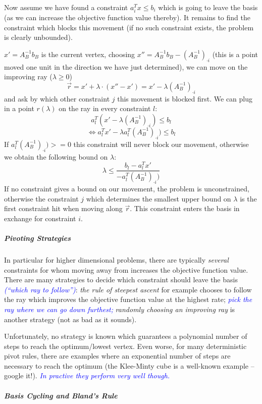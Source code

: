 \documentclass{article}
\begin{document}
Now assume we have found a constraint $a_i^T x \leq b_i$
which is going to leave the basis (as we can increase the objective function value thereby). 
It remains to find the constraint which
blocks this movement (if no such constraint exists, the problem is clearly unbounded).

$x'=A_B^{-1}b_B$ is the current vertex, choosing $x''=A_B^{-1}b_B - (A_B^{-1})_{\cdot i}$ (this is a point moved
one unit in the direction we have just determined), we can move 
on the improving ray  ($\lambda\geq 0$)
\[
	\overrightarrow{r}=x' + \lambda \cdot {(x''-x')}
			= x' - \lambda (A_B^{-1})_{\cdot i}
\]
and ask by which other constraint $j$ this movement is blocked first.
We can plug in a point $r(\lambda)$ on the ray in every constraint $l$:
\[
	a_l^{T}(x'-\lambda (A_B^{-1})_{\cdot i})\leq b_l
\]
\[
\Leftrightarrow	a_l^{T}x'-\lambda a_l^{T}(A_B^{-1})_{\cdot i})\leq b_l
\]
If $a_l^{T}(A_B^{-1})_{\cdot i})>=0$ this constraint will never block our movement, otherwise
we obtain the following bound on $\lambda$:
\[
	\lambda \leq \frac{b_l - a_l^{T}x'}{-a_l^{T}(A_B^{-1})_{\cdot i})}
\]
If no constraint gives a bound on our movement, the problem is unconstrained, otherwise the constraint $j$
which determines the smallest upper bound on $\lambda$ is the first constraint hit when moving along
$\overrightarrow{r}$. This constraint enters the basis in exchange for constraint $i$.

\subparagraph*{Pivoting Strategies}
In particular for higher dimensional problems, there are typically \emph{several} constraints for whom moving away from increases the objective function value. There are many strategies to decide which constraint should leave the basis \textcolor{blue}{\emph{(``which ray to follow'')}}: \emph{the rule of steepest ascent} for example chooses to follow the ray which improves the objective function value at the highest rate; \textcolor{blue}{\emph{pick the ray where we can go down furthest;}} \emph{randomly choosing an improving ray} is another strategy (not as bad as it sounds).

Unfortunately, no strategy is known which guarantees a polynomial number of steps to reach the optimum/lowest vertex. Even worse, for many deterministic pivot rules, there are examples where an exponential number of steps are necessary to reach the optimum (the Klee-Minty cube is a well-known example -- google it!). \textcolor{blue}{\emph{In practive they perform very well though.}}


\subparagraph*{Basis Cycling and Bland's Rule}
\end{document}
